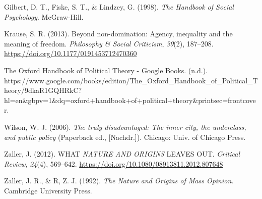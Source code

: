 \documentclass[
  english,
  man]{apa6}
\begin{document}
\hypertarget{refs}{}
\leavevmode\hypertarget{ref-gilbertHandbookSocialPsychology1998}{}%
Gilbert, D. T., Fiske, S. T., \& Lindzey, G. (1998). \emph{The Handbook of Social Psychology}. McGraw-Hill.

\leavevmode\hypertarget{ref-krauseNondominationAgencyInequality2013}{}%
Krause, S. R. (2013). Beyond non-domination: Agency, inequality and the meaning of freedom. \emph{Philosophy \& Social Criticism}, \emph{39}(2), 187--208. \url{https://doi.org/10.1177/0191453712470360}

\leavevmode\hypertarget{ref-OxfordHandbookPolitical}{}%
The Oxford Handbook of Political Theory - Google Books. (n.d.). https://www.google.com/books/edition/The\_Oxford\_Handbook\_of\_Political\_Theory/9dkaR1GQHRkC?hl=en\&gbpv=1\&dq=oxford+handbook+of+political+theory\&printsec=frontcover.

\leavevmode\hypertarget{ref-wilsonTrulyDisadvantagedInner2006}{}%
Wilson, W. J. (2006). \emph{The truly disadvantaged: The inner city, the underclass, and public policy} (Paperback ed., {[}Nachdr.{]}). Chicago: Univ. of Chicago Press.

\leavevmode\hypertarget{ref-zallerWHATNATUREORIGINS2012}{}%
Zaller, J. (2012). WHAT \emph{NATURE AND ORIGINS} LEAVES OUT. \emph{Critical Review}, \emph{24}(4), 569--642. \url{https://doi.org/10.1080/08913811.2012.807648}

\leavevmode\hypertarget{ref-zallerNatureOriginsMass1992}{}%
Zaller, J. R., \& R, Z. J. (1992). \emph{The Nature and Origins of Mass Opinion}. Cambridge University Press.

\endgroup
\end{document}
